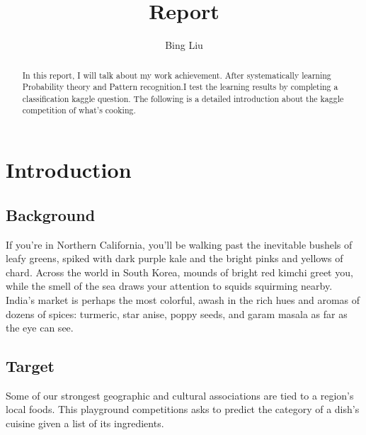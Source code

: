 \documentclass{amsart}
\begin{document}
%
%
\title[Report]{Report}%

\author{Bing Liu}
\address[A.~1]{School of Computer Science,\\ 
Jilin University, ChangChun 130012, China}%


%
\date{\gitAuthorDate}%

%

\begin{abstract}
	In this report, I will talk about my work achievement. After systematically learning Probability theory and Pattern recognition.I test the learning results by completing a classification kaggle question. The following is a detailed introduction about the kaggle competition of what's cooking.
\end{abstract}

%

\maketitle
\tableofcontents

\newpage

%
\section{Introduction}\label{sec-intro}

\subsection{Background}
If you're in Northern California, you'll be walking past the inevitable bushels of leafy greens, spiked with dark purple kale and the bright pinks and yellows of chard. Across the world in South Korea, mounds of bright red kimchi greet you, while the smell of the sea draws your attention to squids squirming nearby. India’s market is perhaps the most colorful, awash in the rich hues and aromas of dozens of spices: turmeric, star anise, poppy seeds, and garam masala as far as the eye can see.\\

\subsection{Target}
Some of our strongest geographic and cultural associations are tied to a region's local foods. This playground competitions asks to predict the category of a dish's cuisine given a list of its ingredients. 
\end{document}
